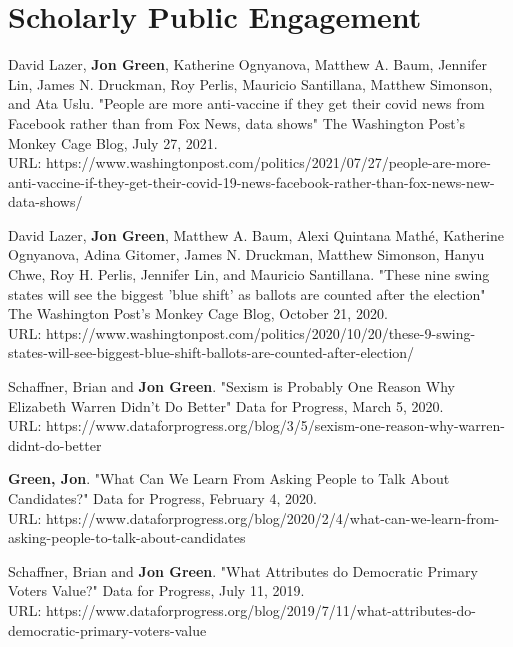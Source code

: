 \documentclass[letterpaper]{article}
\renewenvironment{itemize}{
  \begin{list}{}{
    \setlength{\leftmargin}{1.5em}
  }
}{
  \end{list}
}
\begin{document}
\section*{Scholarly Public Engagement}

\begin{itemize}

\item David Lazer, \textbf{Jon Green}, Katherine Ognyanova, Matthew A. Baum, Jennifer Lin, James N. Druckman, Roy Perlis, Mauricio Santillana, Matthew Simonson, and Ata Uslu. "People are more anti-vaccine if they get their covid news from Facebook rather than from Fox News, data shows" The Washington Post's Monkey Cage Blog, July 27, 2021. \\ 
URL: https://www.washingtonpost.com/politics/2021/07/27/people-are-more-anti-vaccine-if-they-get-their-covid-19-news-facebook-rather-than-fox-news-new-data-shows/

\item David Lazer, \textbf{Jon Green}, Matthew A. Baum, Alexi Quintana Mathé, Katherine Ognyanova, Adina Gitomer, James N. Druckman, Matthew Simonson, Hanyu Chwe, Roy H. Perlis, Jennifer Lin, and Mauricio Santillana. "These nine swing states will see the biggest 'blue shift' as ballots are counted after the election" The Washington Post's Monkey Cage Blog, October 21, 2020. \\ 
URL: https://www.washingtonpost.com/politics/2020/10/20/these-9-swing-states-will-see-biggest-blue-shift-ballots-are-counted-after-election/

\item Schaffner, Brian and \textbf{Jon Green}. "Sexism is Probably One Reason Why Elizabeth Warren Didn't Do Better" Data for Progress, March 5, 2020. \\
URL: https://www.dataforprogress.org/blog/3/5/sexism-one-reason-why-warren-didnt-do-better

\item \textbf{Green, Jon}. "What Can We Learn From Asking People to Talk About Candidates?" Data for Progress, February 4, 2020. \\
URL: https://www.dataforprogress.org/blog/2020/2/4/what-can-we-learn-from-asking-people-to-talk-about-candidates

\item Schaffner, Brian and \textbf{Jon Green}. "What Attributes do Democratic Primary Voters Value?" Data for Progress, July 11, 2019. \\
URL: https://www.dataforprogress.org/blog/2019/7/11/what-attributes-do-democratic-primary-voters-value


\end{itemize}
\end{document}
